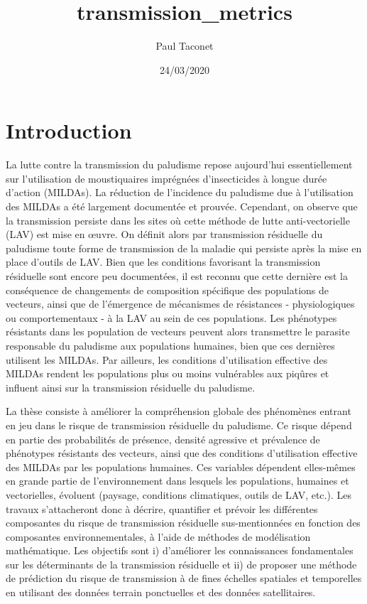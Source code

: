 \documentclass[]{article}
\title{transmission\_metrics}
\author{Paul Taconet}
\date{24/03/2020}
\begin{document}
\maketitle

\hypertarget{introduction}{%
\section{Introduction}\label{introduction}}

La lutte contre la transmission du paludisme repose aujourd'hui
essentiellement sur l'utilisation de moustiquaires imprégnées
d'insecticides à longue durée d'action (MILDAs). La réduction de
l'incidence du paludisme due à l'utilisation des MILDAs a été largement
documentée et prouvée. Cependant, on observe que la transmission
persiste dans les sites où cette méthode de lutte anti-vectorielle (LAV)
est mise en œuvre. On définit alors par transmission résiduelle du
paludisme toute forme de transmission de la maladie qui persiste après
la mise en place d'outils de LAV. Bien que les conditions favorisant la
transmission résiduelle sont encore peu documentées, il est reconnu que
cette dernière est la conséquence de changements de composition
spécifique des populations de vecteurs, ainsi que de l'émergence de
mécanismes de résistances - physiologiques ou comportementaux - à la LAV
au sein de ces populations. Les phénotypes résistants dans les
population de vecteurs peuvent alors transmettre le parasite responsable
du paludisme aux populations humaines, bien que ces dernières utilisent
les MILDAs. Par ailleurs, les conditions d'utilisation effective des
MILDAs rendent les populations plus ou moins vulnérables aux piqûres et
influent ainsi sur la transmission résiduelle du paludisme.

La thèse consiste à améliorer la compréhension globale des phénomènes
entrant en jeu dans le risque de transmission résiduelle du paludisme.
Ce risque dépend en partie des probabilités de présence, densité
agressive et prévalence de phénotypes résistants des vecteurs, ainsi que
des conditions d'utilisation effective des MILDAs par les populations
humaines. Ces variables dépendent elles-mêmes en grande partie de
l'environnement dans lesquels les populations, humaines et vectorielles,
évoluent (paysage, conditions climatiques, outils de LAV, etc.). Les
travaux s'attacheront donc à décrire, quantifier et prévoir les
différentes composantes du risque de transmission résiduelle
sus-mentionnées en fonction des composantes environnementales, à l'aide
de méthodes de modélisation mathématique. Les objectifs sont i)
d'améliorer les connaissances fondamentales sur les déterminants de la
transmission résiduelle et ii) de proposer une méthode de prédiction du
risque de transmission à de fines échelles spatiales et temporelles en
utilisant des données terrain ponctuelles et des données satellitaires.
\end{document}
